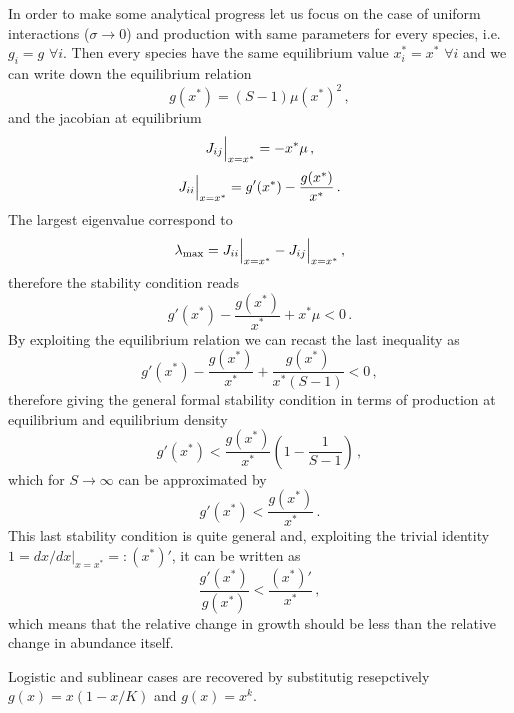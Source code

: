 \documentclass[10pt]{article}
\begin{document}
In order to make some analytical progress let us focus on the case
of uniform interactions ($\sigma\to0$) and production
with same parameters for every species, i.e. $g_i=g$ $\forall i$.
Then every species have the same equilibrium value $x_i^*=x^*$
$\forall i$ and we can write down the equilibrium relation
\begin{equation}
    g(x^*)=(S-1)\mu (x^*)^2 \, ,
\end{equation}
and the jacobian at equilibrium
\begin{equation}
    J_{ij}\Big{|}_{x=x^*} = -x^*\mu \, ,
\end{equation}
\begin{equation}
    J_{ii}\Big{|}_{x=x^*} =  g'(x^*)-\frac{g(x^*)}{x^*}\, .
\end{equation}
The largest eigenvalue correspond to
\begin{equation}
    \lambda_{\max}=J_{ii}\Big{|}_{x=x^*}-J_{ij}\Big{|}_{x=x^*} \, ,
\end{equation}
therefore the stability condition reads
\begin{equation}
    g'(x^*)- \frac{g(x^*)}{x^*} + x^*\mu < 0 \, .
\end{equation}
By exploiting the equilibrium relation we can recast the last
inequality as
\begin{equation}
    g'(x^*)- \frac{g(x^*)}{x^*} + \frac{g(x^*)}{x^*(S-1)} < 0 \, ,
\end{equation}
therefore giving the general formal stability condition in terms
of production at equilibrium and equilibrium density
\begin{equation}
    g'(x^*) < \frac{g(x^*)}{x^*}\left(1 - \frac{1}{S-1}\right) \, ,
\end{equation}
which for $S\to\infty$ can be approximated by 
\begin{equation}
    g'(x^*) < \frac{g(x^*)}{x^*} \, .
\end{equation}
This last stability condition is quite general and, exploiting the trivial identity
$1=dx/dx|_{x=x^*}=:(x^*)'$, it can be written as
\begin{equation}
    \frac{g'(x^*)}{g(x^*)} < \frac{(x^*)'}{x^*}\, ,
\end{equation}
which means that the relative change in growth should be less than the relative
change in abundance itself.

Logistic and sublinear cases are recovered by substitutig resepctively
$g(x)=x(1-x/K)$ and $g(x)=x^k$.

\newpage




\end{document}
